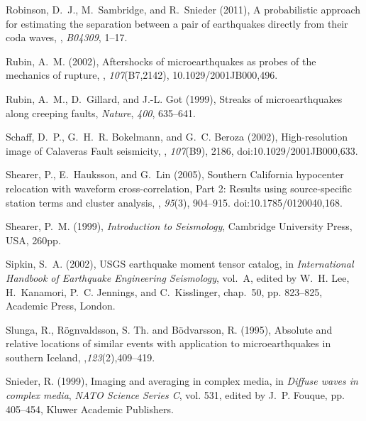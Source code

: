 \documentclass[12pt,double]{article}
\begin{document}
\begin{thebibliography}{45}
Robinson, D.~J., M.~Sambridge, and R.~Snieder (2011), A probabilistic approach
  for estimating the separation between a pair of earthquakes directly from
  their coda waves, \jgr, \textit{B04309},
  1--17.

Rubin, A.~M. (2002), Aftershocks of microearthquakes as probes of the mechanics
  of rupture, \jgr, \textit{107}(B7,2142),
  10.1029/2001JB000,496.

Rubin, A.~M., D.~Gillard, and J.-L. Got (1999), Streaks of microearthquakes
  along creeping faults, \textit{Nature}, \textit{400}, 635--641.

Schaff, D.~P., G.~H.~R. Bokelmann, and G.~C. Beroza (2002), High-resolution
  image of {C}alaveras {F}ault seismicity, \jgr, \textit{107}(B9), 2186, doi:10.1029/2001JB000,633.

Shearer, P., E.~Hauksson, and G.~Lin (2005), Southern {C}alifornia hypocenter
  relocation with waveform cross-correlation, {P}art 2: {R}esults using
  source-specific station terms and cluster analysis, \bssa, \textit{95}(3), 904--915.
  doi:10.1785/0120040,168.

Shearer, P.~M. (1999), \textit{Introduction to Seismology}, Cambridge
  University Press, USA, 260pp.

Sipkin, S.~A. (2002), {USGS} earthquake moment tensor catalog, in
  \textit{International Handbook of Earthquake Engineering Seismology},
  vol.~{A}, edited by W.~H. Lee, H.~Kanamori, P.~C. Jennings, and
  C.~Kisslinger, chap.~50, pp. 823--825, Academic Press, London.

Slunga, R., R{\"o}gnvaldsson, {S. Th.} and B{\"o}dvarsson, R. (1995),
Absolute and relative locations of similar events with application to microearthquakes in southern {I}celand,
\gji,\textit{123}(2),409--419.

Snieder, R. (1999), Imaging and averaging in complex media, in \textit{Diffuse
  waves in complex media}, \textit{NATO Science Series C}, vol. 531, edited by
  J.~P. Fouque, pp. 405--454, Kluwer Academic Publishers.


\end{thebibliography}
\end{document}
